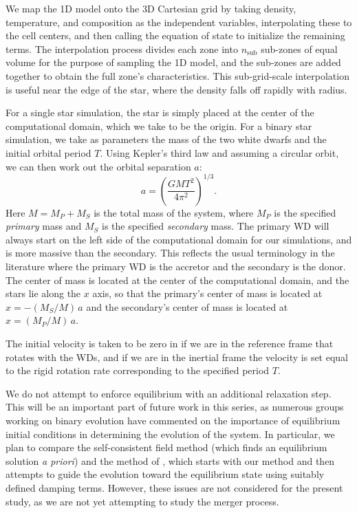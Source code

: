 \documentclass{emulateapj}
\begin{document}
We map the 1D model onto the 3D Cartesian grid by taking density,
temperature, and composition as the independent variables,
interpolating these to the cell centers, and then calling the equation
of state to initialize the remaining terms.  The interpolation process
divides each zone into $n_{\text{sub}}$ sub-zones of equal volume for
the purpose of sampling the 1D model, and the sub-zones are added
together to obtain the full zone's characteristics. This
sub-grid-scale interpolation is useful near the edge of the star,
where the density falls off rapidly with radius.

For a single star simulation, the star is simply placed at the center
of the computational domain, which we take to be the origin. For a
binary star simulation, we take as parameters the mass of the two
white dwarfs and the initial orbital period $T$. Using Kepler's third
law and assuming a circular orbit, we can then work out the orbital
separation $a$:
\begin{equation}
  a = \left(\frac{GM T^2}{4\pi^2}\right)^{1/3}.
\end{equation}
Here $M = M_P + M_S$ is the total mass of the system, where $M_P$ is
the specified \textit{primary} mass and $M_S$ is the specified
\textit{secondary} mass. The primary WD will always start on the left
side of the computational domain for our simulations, and is more
massive than the secondary. This reflects the usual terminology in the
literature where the primary WD is the accretor and the secondary is
the donor. The center of mass is located at the center of the
computational domain, and the stars lie along the $x$ axis, so that
the primary's center of mass is located at $x = -(M_S / M)\, a$ and
the secondary's center of mass is located at $x = (M_P / M)\, a$.

The initial velocity is taken to be zero in if we are in the reference
frame that rotates with the WDs, and if we are in the inertial frame
the velocity is set equal to the rigid rotation rate corresponding to
the specified period $T$.

We do not attempt to enforce equilibrium with an additional relaxation
step. This will be an important part of future work in this series, as
numerous groups working on binary evolution
\citep{swc:2000,motl:2002,rosswog:2004,dan:2011,pakmor:2012:gadget}
have commented on the importance of equilibrium initial conditions in
determining the evolution of the system. In particular, we plan to
compare the self-consistent field method (which finds an equilibrium
solution \textit{a priori}) and the method of \cite{rosswog:2004},
which starts with our method and then attempts to guide the evolution
toward the equilibrium state using suitably defined damping
terms. However, these issues are not considered for the present study,
as we are not yet attempting to study the merger process.
\end{document}
